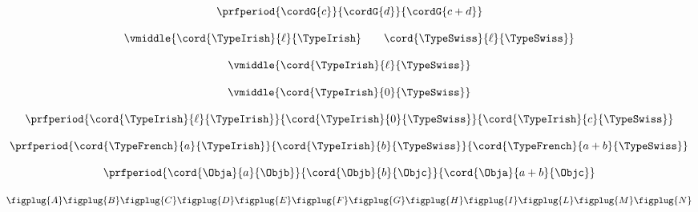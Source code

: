 \begin{forslides}
    \begin{equation}
        \label{eq:semicats-slides-54}
        \prfperiod{
            \cordG{c}
        }{
            \cordG{d}
        }{
            \cordG{c+d}
        }
    \end{equation}

    \begin{equation}
        \label{eq:semicats-slides-55}
        \vmiddle{\cord{\TypeIrish}{\ell}{\TypeIrish} \qquad \cord{\TypeSwiss}{\ell}{\TypeSwiss}}
    \end{equation}

    \begin{equation}
        \label{eq:semicats-slides-56}
        \vmiddle{\cord{\TypeIrish}{\ell}{\TypeSwiss}}
    \end{equation}

    \begin{equation}
        \label{eq:semicats-slides-57}
        \vmiddle{\cord{\TypeIrish}{0}{\TypeSwiss}}
    \end{equation}

    \begin{equation}
        \label{eq:semicats-slides-58a}
        \prfperiod{
            \cord{\TypeIrish}{\ell}{\TypeIrish}
        }{
            \cord{\TypeIrish}{0}{\TypeSwiss}
        }{
            \cord{\TypeIrish}{c}{\TypeSwiss}
        }
    \end{equation}
    
    \begin{equation}
        \label{eq:semicats-slides-58b}
        \prfperiod{
            \cord{\TypeFrench}{a}{\TypeIrish}
        }{
            \cord{\TypeIrish}{b}{\TypeSwiss}
        }{
            \cord{\TypeFrench}{a + b}{\TypeSwiss}
        }
    \end{equation}

    \begin{equation}
        \label{eq:semicats-slides-59}
        \prfperiod{
            \cord{\Obja}{a}{\Objb}
        }{
            \cord{\Objb}{b}{\Objc}
        }{
            \cord{\Obja}{a+b}{\Objc}
        }
    \end{equation}

    \begin{equation}
        \label{eq:semicats-slides-60}
        \centering
        \figplug{A}
        \figplug{B}
        \figplug{C}
        \figplug{D}
        \figplug{E}
        \figplug{F}
        \figplug{G}
        \figplug{H}
        \figplug{I}
        \figplug{L}
        \figplug{M}
        \figplug{N}
    \end{equation}


\end{forslides}
